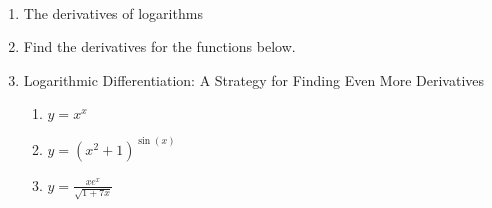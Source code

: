\documentclass[11pt,fleqn]{article}
\begin{document}
\renewcommand{\headrulewidth}{0pt}
\newcommand{\blank}[1]{\rule{#1}{0.75pt}}
\newcommand{\bc}{\begin{center}}
\newcommand{\ec}{\end{center}}
\renewcommand{\d}{\displaystyle}

\vspace*{-0.7in}

\begin{center}
  \large
  \\
\end{center}
\begin{enumerate}
\item The derivatives of logarithms 
\vspace{2in}

\item Find the derivatives for the functions below.
\begin{enumerate}
\vfill
{}
\vfill
\end{enumerate}
\newpage
\item Logarithmic Differentiation: A Strategy for Finding Even More Derivatives
	\begin{enumerate}
	\item $y=x^x$
	\vfill
	\item $y=(x^2+1)^{\sin(x)}$
	\vfill
	\item $y=\frac{xe^x}{\sqrt{1+7x}}$
	\vfill
	\end{enumerate}
		
\end{enumerate}
\end{document}
